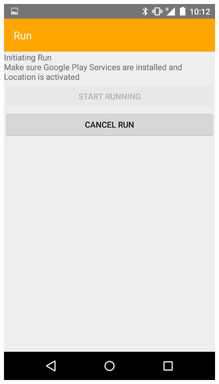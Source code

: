 \begin{figure}
\centering
\begin{minipage}{.4\textwidth}
  \centering
  \includegraphics[width=.8\linewidth]{abb/bsp/bsp9}
  \label{fig:bsp9}
\end{minipage}
\begin{minipage}{.4\textwidth}
  \centering

\end{minipage}
\end{figure}

